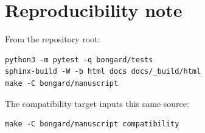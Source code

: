 \documentclass[11pt]{article}
\begin{document}
\section*{Reproducibility note}

From the repository root:
\begin{verbatim}
python3 -m pytest -q bongard/tests
sphinx-build -W -b html docs docs/_build/html
make -C bongard/manuscript
\end{verbatim}
The compatibility target inputs this same source:
\begin{verbatim}
make -C bongard/manuscript compatibility
\end{verbatim}



\end{document}
